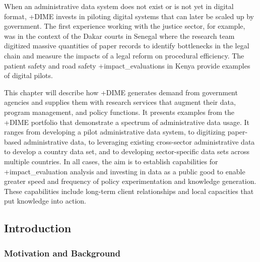 \documentclass[
]{WileySix}
\begin{document}
When an administrative data system does not exist or is not yet in digital format, +DIME\textbar{} invests in piloting digital systems that can later be scaled up by government. The first experience working with the justice sector, for example, was in the context of the Dakar courts in Senegal where the research team digitized massive quantities of paper records to identify bottlenecks in the legal chain and measure the impacts of a legal reform on procedural efficiency. The patient safety and road safety +impact\_evaluations\textbar{} in Kenya provide examples of digital pilots.

This chapter will describe how +DIME\textbar{} generates demand from government agencies and supplies them with research services that augment their data, program management, and policy functions. It presents examples from the +DIME\textbar{} portfolio that demonstrate a spectrum of administrative data usage. It ranges from developing a pilot administrative data system, to digitizing paper-based administrative data, to leveraging existing cross-sector administrative data to develop a country data set, and to developing sector-specific data sets across multiple countries. In all cases, the aim is to establish capabilities for +impact\_evaluation\textbar{} analysis and investing in data as a public good to enable greater speed and frequency of policy experimentation and knowledge generation. These capabilities include long-term client relationships and local capacities that put knowledge into action.

\hypertarget{introduction-8}{%
\subsection{Introduction}\label{introduction-8}}

\hypertarget{motivation-and-background-7}{%
\subsubsection{Motivation and Background}\label{motivation-and-background-7}}
\end{document}
